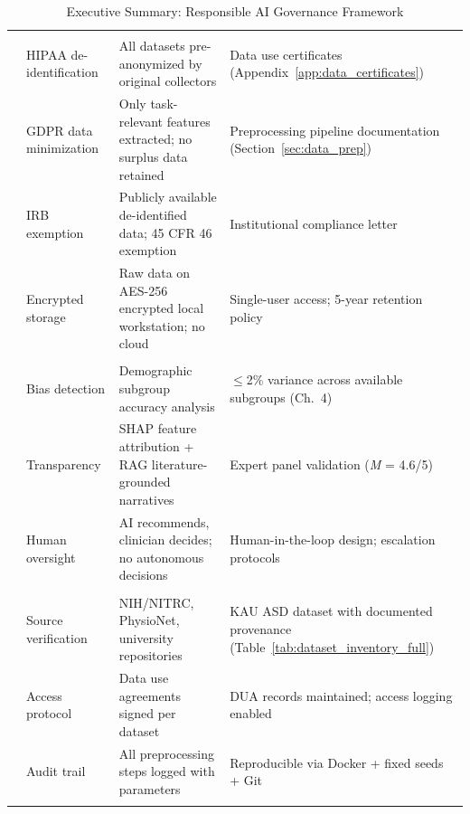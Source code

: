 \begin{xltabular}
{\textwidth}{@{} >{\raggedright\arraybackslash}p{2cm} >{\raggedright\arraybackslash}p{2.5cm} L L @{}}
\caption[Executive Summary]{Executive Summary: Responsible AI Governance Framework}\label{tab:responsible_ai_summary} \\
\toprule
{} &  &  &  \\
\midrule
\endfirsthead
\endhead
\bottomrule
\endfoot
{} \\
\addlinespace
& HIPAA de-identification & All datasets pre-anonymized by original collectors & Data use certificates (Appendix~\ref{app:data_certificates}) \\
& GDPR data minimization & Only task-relevant features extracted; no surplus data retained & Preprocessing pipeline documentation (Section~\ref{sec:data_prep}) \\
& IRB exemption & Publicly available de-identified data; 45 CFR 46 exemption & Institutional compliance letter \\
& Encrypted storage & Raw data on AES-256 encrypted local workstation; no cloud & Single-user access; 5-year retention policy \\
\addlinespace
{} \\
\addlinespace
& Bias detection & Demographic subgroup accuracy analysis & $\leq$2\% variance across available subgroups (Ch.~4) \\
& Transparency & SHAP feature attribution + RAG literature-grounded narratives & Expert panel validation (\textit{M} = 4.6/5) \\
& Human oversight & AI recommends, clinician decides; no autonomous decisions & Human-in-the-loop design; escalation protocols \\
\addlinespace
{} \\
\addlinespace
& Source verification & NIH/NITRC, PhysioNet, university repositories & KAU ASD dataset with documented provenance (Table~\ref{tab:dataset_inventory_full}) \\
& Access protocol & Data use agreements signed per dataset & DUA records maintained; access logging enabled \\
& Audit trail & All preprocessing steps logged with parameters & Reproducible via Docker + fixed seeds + Git \\
\addlinespace
{} \\

\end{xltabular}
